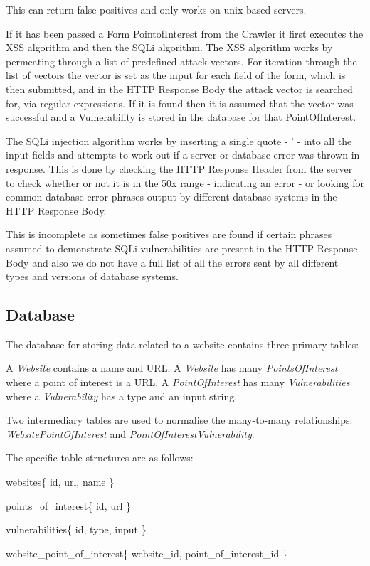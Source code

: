 \documentclass[12pt,a4paper]{article}
\begin{document}
This can return false positives and only works on unix based servers.

If it has been passed a Form PointofInterest from the Crawler it first executes the XSS algorithm and then the SQLi algorithm.  The XSS algorithm works by permeating through a list of predefined attack vectors. For iteration through the list of vectors the vector is set as the input for each field of the form, which is then submitted, and in the HTTP Response Body the attack vector is searched for, via regular expressions.  If it is found then it is assumed that the vector was successful and a Vulnerability is stored in the database for that PointOfInterest.

The SQLi injection algorithm works by inserting a single quote - ' - into all the input fields and attempts to work out if a server or database error was thrown in response.  This is done by checking the HTTP Response Header from the server to check whether or not it is in the 50x range - indicating an error - or looking for common database error phrases output by different database systems in the HTTP Response Body.  

This is incomplete as sometimes false positives are found if certain phrases assumed to demonstrate SQLi vulnerabilities are present in the HTTP Response Body and also we do not have a full list of all the errors sent by all different types and versions of database systems.

\subsection{Database}
The database for storing data related to a website contains three primary tables:

A \emph{Website} contains a name and URL.
A \emph{Website} has many \emph{PointsOfInterest} where a point of interest is a URL.
A \emph{PointOfInterest} has many \emph{Vulnerabilities} where a \emph{Vulnerability} has a type and an input string.

Two intermediary tables are used to normalise the many-to-many relationships: \emph{WebsitePointOfInterest} and \emph{PointOfInterestVulnerability}.

The specific table structures are as follows:

websites\{ id, url, name \}

points\_of\_interest\{ id, url \}

vulnerabilities\{ id, type, input \}

website\_point\_of\_interest\{ website\_id, point\_of\_interest\_id \}
\end{document}
